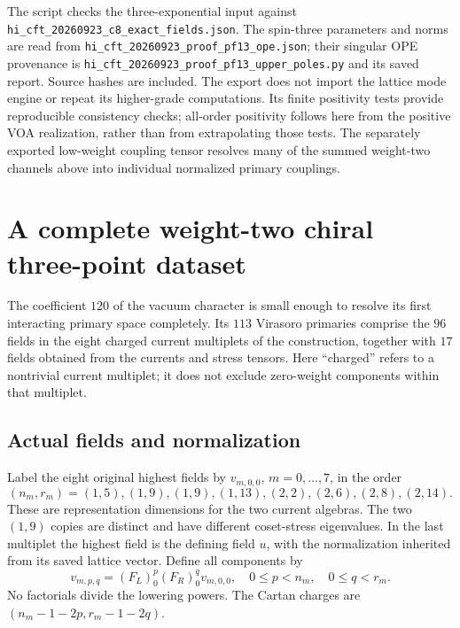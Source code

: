 \documentclass[11pt,a4paper]{article}
\theoremstyle{definition}
\newcommand{\artifact}[1]{\textnormal{\nolinkurl{#1}}}
\begin{document}
The script checks the three-exponential input against
\artifact{hi_cft_20260923_c8_exact_fields.json}.  The spin-three
parameters and norms are read from
\artifact{hi_cft_20260923_proof_pf13_ope.json}; their singular OPE
provenance is
\artifact{hi_cft_20260923_proof_pf13_upper_poles.py} and its saved
report.  Source hashes are included.  The export does not import the
lattice mode engine or repeat its higher-grade computations.  Its
finite positivity tests provide reproducible consistency checks;
all-order positivity follows here from the positive VOA realization,
rather than from extrapolating those tests.  The separately exported
low-weight coupling tensor resolves many of the summed weight-two
channels above into individual normalized primary couplings.

\section{A complete weight-two chiral three-point dataset}
\label{sec:physics-couplings}

The coefficient $120$ of the vacuum character is small enough to
resolve its first interacting primary space completely. Its $113$
Virasoro primaries comprise the $96$ fields in the eight charged
current multiplets of the construction, together with $17$ fields
obtained from the currents and stress tensors. Here ``charged'' refers
to a nontrivial current multiplet; it does not exclude zero-weight
components within that multiplet.

\subsection{Actual fields and normalization}

Label the eight original highest fields by $v_{m,0,0}$,
$m=0,\ldots,7$, in the order
\[
 (n_m,r_m)=(1,5),(1,9),(1,9),(1,13),
            (2,2),(2,6),(2,8),(2,14).
\]
These are representation dimensions for the two current algebras.
The two $(1,9)$ copies are distinct and have different coset-stress
eigenvalues. In the last multiplet the highest field is the defining
field $u$, with the normalization inherited from its saved lattice
vector. Define all components by
\begin{equation}\label{eq:physics-primary-basis}
 v_{m,p,q}=(F_L)_0^p(F_R)_0^qv_{m,0,0},
 \quad 0\leq p<n_m,\quad0\leq q<r_m.
\end{equation}
No factorials divide the lowering powers. The Cartan charges are
$(n_m-1-2p,r_m-1-2q)$.
\end{document}
